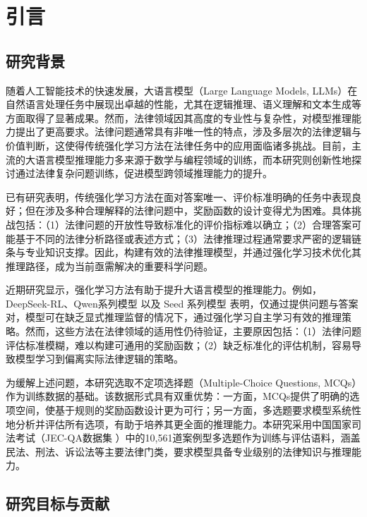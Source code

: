 \documentclass{pkuthesis}
\begin{document}
\section{引言}

\subsection{研究背景}

随着人工智能技术的快速发展，大语言模型（Large Language Models, LLMs）在自然语言处理任务中展现出卓越的性能，尤其在逻辑推理、语义理解和文本生成等方面取得了显著成果。然而，法律领域因其高度的专业性与复杂性，对模型推理能力提出了更高要求。法律问题通常具有非唯一性的特点，涉及多层次的法律逻辑与价值判断，这使得传统强化学习方法在法律任务中的应用面临诸多挑战。目前，主流的大语言模型推理能力多来源于数学与编程领域的训练，而本研究则创新性地探讨通过法律复杂问题训练，促进模型跨领域推理能力的提升。

已有研究表明，传统强化学习方法在面对答案唯一、评价标准明确的任务中表现良好；但在涉及多种合理解释的法律问题中，奖励函数的设计变得尤为困难。具体挑战包括：（1）法律问题的开放性导致标准化的评价指标难以确立；（2）合理答案可能基于不同的法律分析路径或表述方式；（3）法律推理过程通常要求严密的逻辑链条与专业知识支撑。因此，构建有效的法律推理模型，并通过强化学习技术优化其推理路径，成为当前亟需解决的重要科学问题。

近期研究显示，强化学习方法有助于提升大语言模型的推理能力。例如，DeepSeek-RL\cite{guo2025deepseek}、Qwen系列模型\cite{yang2024qwen2} 以及 Seed 系列模型\cite{seed2025seed} 表明，仅通过提供问题与答案对，模型可在缺乏显式推理监督的情况下，通过强化学习自主学习有效的推理策略。然而，这些方法在法律领域的适用性仍待验证，主要原因包括：（1）法律问题评估标准模糊，难以构建可通用的奖励函数；（2）缺乏标准化的评估机制，容易导致模型学习到偏离实际法律逻辑的策略。

为缓解上述问题，本研究选取不定项选择题（Multiple-Choice Questions, MCQs）作为训练数据的基础。该数据形式具有双重优势：一方面，MCQs提供了明确的选项空间，使基于规则的奖励函数设计更为可行；另一方面，多选题要求模型系统性地分析并评估所有选项，有助于培养其更全面的推理能力。本研究采用中国国家司法考试（JEC-QA数据集 \cite{zhong2020jec}）中的10,561道案例型多选题作为训练与评估语料，涵盖民法、刑法、诉讼法等主要法律门类，要求模型具备专业级别的法律知识与推理能力。

\subsection{研究目标与贡献}
\end{document}
